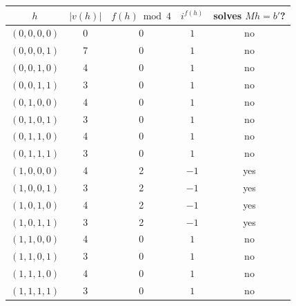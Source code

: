 \begin{tabular}{ccccc}\toprule
$h$ & $|v(h)|$ & $f(h)\bmod4$ & $i^{f(h)}$ & solves $Mh=b'$? \\\midrule
$(0,0,0,0)$ & 0 & 0 & $1$ & no \\
$(0,0,0,1)$ & 7 & 0 & $1$ & no \\
$(0,0,1,0)$ & 4 & 0 & $1$ & no \\
$(0,0,1,1)$ & 3 & 0 & $1$ & no \\
$(0,1,0,0)$ & 4 & 0 & $1$ & no \\
$(0,1,0,1)$ & 3 & 0 & $1$ & no \\
$(0,1,1,0)$ & 4 & 0 & $1$ & no \\
$(0,1,1,1)$ & 3 & 0 & $1$ & no \\
$(1,0,0,0)$ & 4 & 2 & $-1$ & yes \\
$(1,0,0,1)$ & 3 & 2 & $-1$ & yes \\
$(1,0,1,0)$ & 4 & 2 & $-1$ & yes \\
$(1,0,1,1)$ & 3 & 2 & $-1$ & yes \\
$(1,1,0,0)$ & 4 & 0 & $1$ & no \\
$(1,1,0,1)$ & 3 & 0 & $1$ & no \\
$(1,1,1,0)$ & 4 & 0 & $1$ & no \\
$(1,1,1,1)$ & 3 & 0 & $1$ & no \\
\bottomrule\end{tabular}
